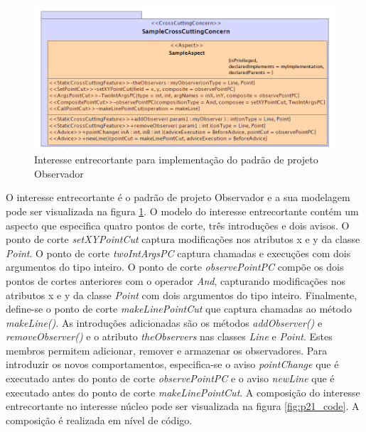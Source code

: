\begin{landscape}
\begin{figure}
	\centering
	\includegraphics[scale=0.8]{img/p21_extension_model.png}
	\caption{Interesse entrecortante para implementação do padrão de projeto Observador}\label{fig:p21_extension_model}
\end{figure}
\end{landscape}

O interesse entrecortante é o padrão de projeto Observador e a sua modelagem  pode ser visualizada na figura \ref{fig:p21_extension_model}. 
O modelo do interesse entrecortante contém um aspecto que especifica quatro pontos de corte, três introduções e dois avisos. O ponto de corte
\textit{setXYPointCut} captura modificações nos atributos x e y da classe \textit{Point}. O ponto de corte  \textit{twoIntArgsPC} captura chamadas e
execuções com dois argumentos do tipo inteiro. O ponto de corte \textit{observePointPC} compõe os dois pontos de cortes anteriores com o operador \textit{And},
capturando modificações nos atributos x e y da classe \textit{Point} com dois argumentos do tipo inteiro. Finalmente, define-se o ponto de corte 
\textit{makeLinePointCut} que captura chamadas ao método \textit{makeLine()}. As introduções adicionadas são os métodos \textit{addObserver()} e
\textit{removeObserver()} e o atributo \textit{theObservers} nas classes \textit{Line} e \textit{Point}. Estes membros permitem adicionar, remover e
armazenar os observadores. Para introduzir os novos comportamentos, especifica-se o aviso \textit{pointChange} que é executado antes do ponto de
corte \textit{observePointPC} e o aviso \textit{newLine} que é executado antes do ponto de corte \textit{makeLinePointCut}. A composição do interesse
entrecortante no interesse núcleo pode ser visualizada na figura \ref{fig:p21_code}. A composição é realizada em nível de código.

